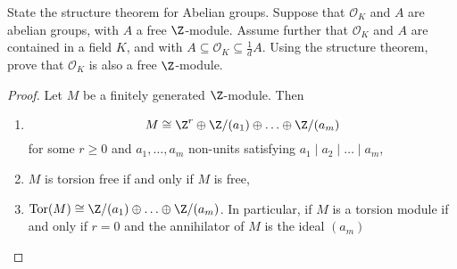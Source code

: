 \documentclass[10pt]{amsart}
\begin{document}
\begin{thm}
  State the structure theorem for Abelian groups.
  Suppose that $\mathcal{O}_K$ and $A$ are abelian groups, with $A$ a free $\Z$-module.
  Assume further that $\mathcal{O}_K$ and $A$ are contained in a field $K$, and with $A \subseteq \mathcal{O}_K \subseteq \frac{1}{d}A$.
  Using the structure theorem, prove that $\mathcal{O}_K$ is also a free $\Z$-module.

  \begin{proof}
    Let $M$ be a finitely generated $\Z$-module.
    Then
    \begin{enumerate}
      \item\label{6.1}
        $$M \cong \Z^r \oplus \Z/(a_1) \oplus \ldots \oplus \Z/(a_m)$$
        for some $r \geq 0$ and $a_1, \ldots, a_m$ non-units satisfying $a_1 \mid a_2 \mid \ldots \mid a_m$,
      \item
        $M$ is torsion free if and only if $M$ is free,
      \item
        $\operatorname{Tor}(M) \cong \Z/(a_1) \oplus \ldots \oplus \Z/(a_m)$.
        In particular, if $M$ is a torsion module if and only if $r = 0$ and the annihilator of $M$ is the ideal $(a_m)$
    \end{enumerate}
  \end{proof}
\end{thm}
\end{document}
